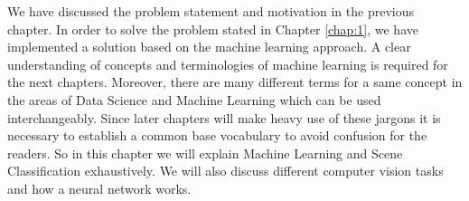 We have discussed the problem statement and motivation in the previous chapter. In order to solve the problem stated in Chapter \ref{chap:1}, we have implemented a solution based on the machine learning approach. A clear understanding of concepts and terminologies of machine learning is required for the next chapters. Moreover, there are many different terms for a same concept in the areas of Data Science and Machine Learning which can be used interchangeably. Since later chapters will make heavy use of these jargons it is necessary to establish a common base vocabulary to avoid confusion for the readers. So in this chapter we will explain Machine Learning and Scene Classification exhaustively. We will also discuss different computer vision tasks and how a neural network works.





